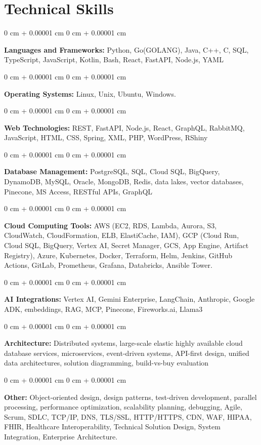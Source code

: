 \documentclass[10pt, letterpaper]{article}
\newenvironment{onecolentry}{
    \begin{adjustwidth}{
        0 cm + 0.00001 cm
    }{
        0 cm + 0.00001 cm
    }
}{
    \end{adjustwidth}
} %
\begin{document}
    \section{Technical Skills}
    \vspace{2 pt }
    \begin{onecolentry}
    \textbf{Languages and Frameworks:} Python, Go(GOLANG), Java, C++, C, SQL, TypeScript, JavaScript, Kotlin, Bash, React, FastAPI, Node.js, YAML
    \end{onecolentry}
    \begin{onecolentry}
        \textbf{Operating Systems:} Linux, Unix, Ubuntu, Windows.
    \end{onecolentry}
    \begin{onecolentry}
         \textbf{Web Technologies:} REST, FastAPI, Node.js, React, GraphQL, RabbitMQ, JavaScript, HTML, CSS, Spring, XML, PHP, WordPress, RShiny
    \end{onecolentry}
    \begin{onecolentry}
        \textbf{Database Management:} PostgreSQL, SQL, Cloud SQL, BigQuery, DynamoDB, MySQL, Oracle, MongoDB, Redis, data lakes, vector databases, Pinecone, MS Access, RESTful APIs, GraphQL
    \end{onecolentry}
    \begin{onecolentry}
        \textbf{Cloud Computing Tools:}
AWS (EC2, RDS, Lambda, Aurora, S3, CloudWatch, CloudFormation, ELB, ElastiCache, IAM), GCP (Cloud Run, Cloud SQL, BigQuery, Vertex AI, Secret Manager, GCS, App Engine, Artifact Registry), Azure, Kubernetes, Docker, Terraform, Helm, Jenkins, GitHub Actions, GitLab, Prometheus, Grafana, Databricks, Ansible Tower.
    \end{onecolentry}
    \begin{onecolentry}
         \textbf{AI Integrations:} Vertex AI, Gemini Enterprise, LangChain, Anthropic, Google ADK, embeddings, RAG, MCP, Pinecone, Fireworks.ai, Llama3
    \end{onecolentry}
    \begin{onecolentry}
        \textbf{Architecture:} Distributed systems, large-scale elastic highly available cloud database services, microservices, event-driven systems, API-first design, unified data architectures, solution diagramming, build-vs-buy evaluation
    \end{onecolentry}
        \begin{onecolentry}
     \textbf{Other:} Object-oriented design, design patterns, test-driven development, parallel processing, performance optimization, scalability planning, debugging, Agile, Scrum, SDLC, TCP/IP, DNS, TLS/SSL, HTTP/HTTPS, CDN, WAF, HIPAA, FHIR, Healthcare Interoperability, Technical Solution Design, System Integration, Enterprise Architecture.
    \end{onecolentry}
\end{document}
